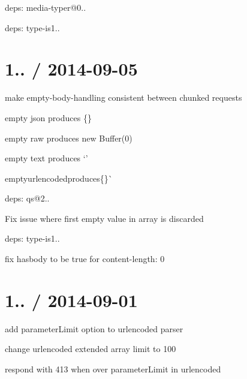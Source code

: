 \begin{DoxyItemize}
\item deps\+: media-\/typer@0..
\item deps\+: type-\/is1..
\end{DoxyItemize}

\section*{1.. / 2014-\/09-\/05 }


\begin{DoxyItemize}
\item make empty-\/body-\/handling consistent between chunked requests
\begin{DoxyItemize}
\item empty {\ttfamily json} produces {\ttfamily \{\}}
\item empty {\ttfamily raw} produces {\ttfamily new Buffer(0)}
\item empty {\ttfamily text} produces `'\textquotesingle{}{\ttfamily }
\item {\ttfamily empty}urlencoded{\ttfamily produces}\{\}\`{}
\end{DoxyItemize}
\item deps\+: qs@2..
\begin{DoxyItemize}
\item Fix issue where first empty value in array is discarded
\end{DoxyItemize}
\item deps\+: type-\/is1..
\begin{DoxyItemize}
\item fix {\ttfamily hasbody} to be true for {\ttfamily content-\/length\+: 0}
\end{DoxyItemize}
\end{DoxyItemize}

\section*{1.. / 2014-\/09-\/01 }


\begin{DoxyItemize}
\item add {\ttfamily parameter\+Limit} option to {\ttfamily urlencoded} parser
\item change {\ttfamily urlencoded} extended array limit to 100
\item respond with 413 when over {\ttfamily parameter\+Limit} in {\ttfamily urlencoded}
\end{DoxyItemize}


